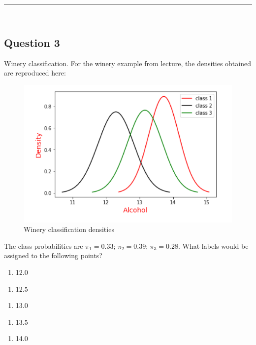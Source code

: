 \documentclass{article}
\begin{document}
\noindent\rule{\textwidth}{0.4pt}\\

\newpage

\subsection*{Question 3}
\parbox{\textwidth}{Winery classification. For the winery example from lecture, the densities obtained are reproduced
here:}

\begin{figure}[H]

\includegraphics[width=1\textwidth]{dsc_255_hw3_q3.png} 
\caption{Winery classification densities}
    
\end{figure}

\parbox{\textwidth}{The class probabilities are $\pi_1 = 0.33$; $\pi_2 = 0.39$; $\pi_3 = 0.28$. What labels would be assigned to the
following points?}

\begin{enumerate}[label=(a)]
    \item 12.0
\end{enumerate}
\begin{enumerate}[label=(b)]
    \item 12.5
\end{enumerate}
\begin{enumerate}[label=(c)]
    \item 13.0
\end{enumerate}
\begin{enumerate}[label=(d)]
    \item 13.5
\end{enumerate}
\begin{enumerate}[label=(e)]
    \item 14.0
\end{enumerate}
\end{document}
